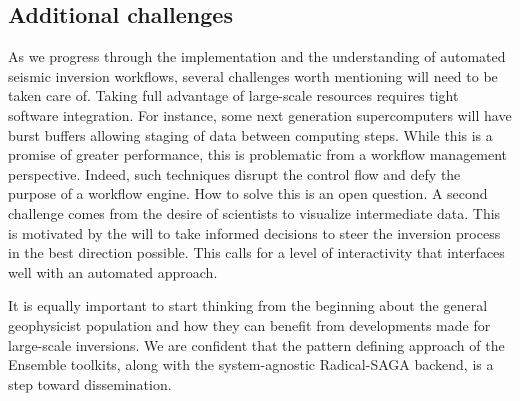 \subsection{Additional challenges}

As we progress through the implementation and the understanding of automated
seismic inversion workflows, several challenges worth mentioning will need to
be taken care of.
Taking full advantage of large-scale resources requires tight software
integration. For instance, some next generation supercomputers will have burst
buffers allowing staging of data between computing steps. While this is a promise
of greater performance, this is problematic from a workflow management
perspective. Indeed, such techniques disrupt the control flow and defy the
purpose of a workflow engine. How to solve this is an open question.
A second challenge comes from the desire of scientists to visualize intermediate
data. This is motivated by the will to take informed decisions to steer the
inversion process in the best direction possible. This calls for a level of
interactivity that interfaces well with an automated approach.

It is equally important to start thinking from the beginning about the general
geophysicist population and how they can benefit from developments made
for large-scale inversions. We are confident that the pattern defining approach
of the Ensemble toolkits, along with the system-agnostic Radical-SAGA backend,
is a step toward dissemination.
